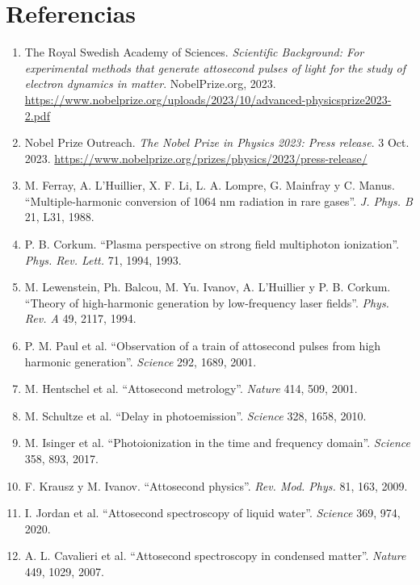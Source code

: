\documentclass[12pt]{article}
\begin{document}
\section*{Referencias}
\begin{enumerate}
\item The Royal Swedish Academy of Sciences. \textit{Scientific Background: For experimental methods that generate attosecond pulses of light for the study of electron dynamics in matter}. NobelPrize.org, 2023. \url{https://www.nobelprize.org/uploads/2023/10/advanced-physicsprize2023-2.pdf}
\item Nobel Prize Outreach. \textit{The Nobel Prize in Physics 2023: Press release}. 3 Oct. 2023. \url{https://www.nobelprize.org/prizes/physics/2023/press-release/}
\item M. Ferray, A. L'Huillier, X. F. Li, L. A. Lompre, G. Mainfray y C. Manus. ``Multiple-harmonic conversion of 1064 nm radiation in rare gases''. \textit{J. Phys. B} 21, L31, 1988.
\item P. B. Corkum. ``Plasma perspective on strong field multiphoton ionization''. \textit{Phys. Rev. Lett.} 71, 1994, 1993.
\item M. Lewenstein, Ph. Balcou, M. Yu. Ivanov, A. L'Huillier y P. B. Corkum. ``Theory of high-harmonic generation by low-frequency laser fields''. \textit{Phys. Rev. A} 49, 2117, 1994.
\item P. M. Paul et al. ``Observation of a train of attosecond pulses from high harmonic generation''. \textit{Science} 292, 1689, 2001.
\item M. Hentschel et al. ``Attosecond metrology''. \textit{Nature} 414, 509, 2001.
\item M. Schultze et al. ``Delay in photoemission''. \textit{Science} 328, 1658, 2010.
\item M. Isinger et al. ``Photoionization in the time and frequency domain''. \textit{Science} 358, 893, 2017.
\item F. Krausz y M. Ivanov. ``Attosecond physics''. \textit{Rev. Mod. Phys.} 81, 163, 2009.
\item I. Jordan et al. ``Attosecond spectroscopy of liquid water''. \textit{Science} 369, 974, 2020.
\item A. L. Cavalieri et al. ``Attosecond spectroscopy in condensed matter''. \textit{Nature} 449, 1029, 2007.
\end{enumerate}
\end{document}
